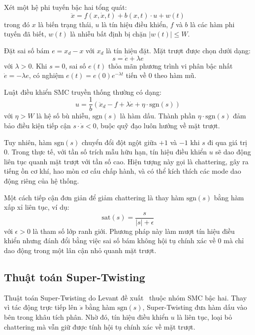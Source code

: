 \documentclass[12pt,a4paper]{report}
\begin{document}
Xét một hệ phi tuyến bậc hai tổng quát:
\begin{equation}
\ddot{x} = f(x, \dot{x}, t) + b(x, t) \cdot u + w(t)
\end{equation}
trong đó $x$ là biến trạng thái, $u$ là tín hiệu điều khiển, $f$ và $b$ là các hàm phi tuyến đã biết, $w(t)$ là nhiễu bất định bị chặn $|w(t)| \le W$.

Đặt sai số bám $e = x_d - x$ với $x_d$ là tín hiệu đặt. Mặt trượt được chọn dưới dạng:
\begin{equation}
s = \dot{e} + \lambda e
\end{equation}
với $\lambda > 0$. Khi $s = 0$, sai số $e(t)$ thỏa mãn phương trình vi phân bậc nhất $\dot{e} = -\lambda e$, có nghiệm $e(t) = e(0) e^{-\lambda t}$ tiến về $0$ theo hàm mũ.

Luật điều khiển SMC truyền thống thường có dạng:
\begin{equation}
u = \frac{1}{b} \left( \ddot{x}_d - f + \lambda \dot{e} + \eta \cdot \text{sgn}(s) \right)
\end{equation}
với $\eta > W$ là hệ số bù nhiễu, $\text{sgn}(s)$ là hàm dấu. Thành phần $\eta \cdot \text{sgn}(s)$ đảm bảo điều kiện tiếp cận $s \cdot \dot{s} < 0$, buộc quỹ đạo luôn hướng về mặt trượt.

Tuy nhiên, hàm $\text{sgn}(s)$ chuyển đổi đột ngột giữa $+1$ và $-1$ khi $s$ đi qua giá trị $0$. Trong thực tế, với tần số trích mẫu hữu hạn, tín hiệu điều khiển $u$ sẽ dao động liên tục quanh mặt trượt với tần số cao. Hiện tượng này gọi là chattering, gây ra tiếng ồn cơ khí, hao mòn cơ cấu chấp hành, và có thể kích thích các mode dao động riêng của hệ thống.

Một cách tiếp cận đơn giản để giảm chattering là thay hàm $\text{sgn}(s)$ bằng hàm xấp xỉ liên tục, ví dụ:
\begin{equation}
\text{sat}(s) = \frac{s}{|s| + \epsilon}
\end{equation}
với $\epsilon > 0$ là tham số lớp ranh giới. Phương pháp này làm mượt tín hiệu điều khiển nhưng đánh đổi bằng việc sai số bám không hội tụ chính xác về $0$ mà chỉ dao động trong một lân cận nhỏ quanh mặt trượt.

\subsection{Thuật toán Super-Twisting}
Thuật toán Super-Twisting do Levant đề xuất~\cite{levant1993} thuộc nhóm SMC bậc hai. Thay vì tác động trực tiếp lên $\dot{s}$ bằng hàm $\text{sgn}(s)$, Super-Twisting đưa hàm dấu vào bên trong khâu tích phân. Nhờ đó, tín hiệu điều khiển $u$ là liên tục, loại bỏ chattering mà vẫn giữ được tính hội tụ chính xác về mặt trượt.
\end{document}

